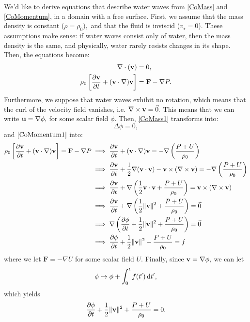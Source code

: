 \documentclass[10pt,reqno,oneside,a4paper]{article}
\begin{document}
We'd like to derive equations that describe water waves from \eqref{CoMass} and \eqref{CoMomentum}, in a domain with a free surface. First, we assume that the mass density is constant ($\rho = \rho_0),$ and that the fluid is inviscid ($v_{\star} = 0$). These assumptions make sense: if water waves consist only of water, then the mass density is the same, and physically, water rarely resists changes in its shape. Then, the equations become:
\begin{align}
\nabla \cdot ({\bf v}) &= 0, \label{CoMass1} \\
\rho_0\left[ \frac{\partial {\bf v}}{\partial t} + ({\bf v} \cdot \nabla) {\bf v}\right] &= \textbf{F} - \nabla P. \label{CoMomentum1}
\end{align}
Furthermore, we suppose that water waves exhibit no rotation, which means that the curl of the velocity field vanishes, i.e. $\nabla \times {\bf v} = \vec{0}.$ This means that we can write ${\bf u} = \nabla \phi,$ for some scalar field $\phi.$ Then, \eqref{CoMass1} transforms into:
\begin{equation}
\Delta \phi = 0, \label{CoMass2} 
\end{equation}
and $\eqref{CoMomentum1}$ into:
\begin{align}
\rho_0\left[\frac{\partial {\bf v}}{\partial t} + ({\bf v} \cdot \nabla) {\bf v} \right] = \mathbf{F} -\nabla P &\implies \frac{\partial {\bf v}}{\partial t} + ({\bf v} \cdot \nabla) {\bf v} = - \nabla \left( \frac{P+U}{\rho_0}\right) \nonumber\\
&\implies \frac{\partial {\bf v}}{\partial t} + \frac{1}{2}\nabla ( {\bf v} \cdot {\bf v}) - {\bf v} \times (\nabla \times {\bf v}) = - \nabla \left( \frac{P+U}{\rho_0}\right) \nonumber\\
&\implies \frac{\partial {\bf v}}{\partial t} + \nabla \left(\frac{1}{2} {\bf v} \cdot {\bf v} + \frac{P+U}{\rho_0}\right) = {\bf v} \times (\nabla \times {\bf v}) \nonumber\\
&\implies \frac{\partial {\bf v}}{\partial t} + \nabla \left(\frac{1}{2} \Vert {\bf v} \Vert^2 + \frac{P+U}{\rho_0}\right) = \vec{0}  \nonumber\\
&\implies \nabla \left(\frac{\partial \phi}{\partial t} + \frac{1}{2} \Vert {\bf v} \Vert^2 + \frac{P+U}{\rho_0} \right) = \vec{0}  \nonumber\\
&\implies \frac{\partial \phi}{\partial t} + \frac{1}{2} \Vert {\bf v} \Vert^2 + \frac{P+U}{\rho_0} = f \label{CoMomentum2} 
\end{align}
where we let $\textbf{F} = -\nabla U$ for some scalar field $U.$ Finally, since ${\bf v} = \nabla \phi,$ we can let 
\[ 
\phi \mapsto \phi + \int^t_0 f(t') \,\mathrm{d} t',
\]
which yields 
\[ 
\frac{\partial \phi}{\partial t} + \frac{1}{2} \Vert {\bf v} \Vert^2 + \frac{P+U}{\rho_0} = 0.
\]
\end{document}
